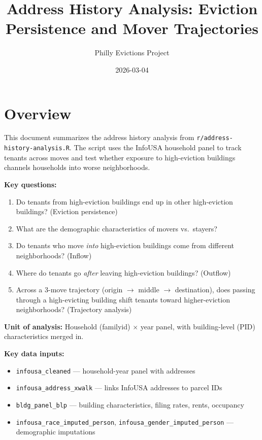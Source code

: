 \documentclass[
  11pt,
]{article}
\title{Address History Analysis: Eviction Persistence and Mover
Trajectories}
\author{Philly Evictions Project}
\date{2026-03-04}
\providecommand{\tightlist}{%
  \setlength{\itemsep}{0pt}\setlength{\parskip}{0pt}}
\renewcommand*\contentsname{Table of contents}
\newcommand\contentsname{Table of contents}
\begin{document}
\maketitle

\renewcommand*\contentsname{Table of contents}
{
\hypersetup{linkcolor=}
\setcounter{tocdepth}{3}
\tableofcontents
}

\section{Overview}\label{overview}

This document summarizes the address history analysis from
\texttt{r/address-history-analysis.R}. The script uses the InfoUSA
household panel to track tenants across moves and test whether exposure
to high-eviction buildings channels households into worse neighborhoods.

\textbf{Key questions:}

\begin{enumerate}
\def\labelenumi{\arabic{enumi}.}
\tightlist
\item
  Do tenants from high-eviction buildings end up in other high-eviction
  buildings? (Eviction persistence)
\item
  What are the demographic characteristics of movers vs.~stayers?
\item
  Do tenants who move \emph{into} high-eviction buildings come from
  different neighborhoods? (Inflow)
\item
  Where do tenants go \emph{after} leaving high-eviction buildings?
  (Outflow)
\item
  Across a 3-move trajectory (origin \(\to\) middle \(\to\)
  destination), does passing through a high-evicting building shift
  tenants toward higher-eviction neighborhoods? (Trajectory analysis)
\end{enumerate}

\textbf{Unit of analysis:} Household (familyid) \(\times\) year panel,
with building-level (PID) characteristics merged in.

\textbf{Key data inputs:}

\begin{itemize}
\tightlist
\item
  \texttt{infousa\_cleaned} --- household-year panel with addresses
\item
  \texttt{infousa\_address\_xwalk} --- links InfoUSA addresses to parcel
  IDs
\item
  \texttt{bldg\_panel\_blp} --- building characteristics, filing rates,
  rents, occupancy
\item
  \texttt{infousa\_race\_imputed\_person},
  \texttt{infousa\_gender\_imputed\_person} --- demographic imputations
\end{itemize}
\end{document}
